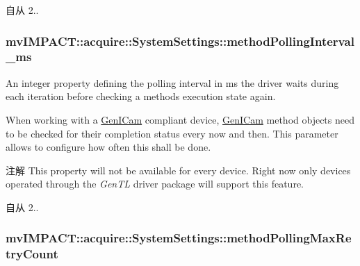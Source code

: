 \begin{DoxySince}{自从}
2.. 
\end{DoxySince}
\hypertarget{classmv_i_m_p_a_c_t_1_1acquire_1_1_system_settings_ac2f583cba036d74278d8093d4f529c4a}{
\subsubsection[{method\+Polling\+Interval\+\_\+ms}]{ mv\+I\+M\+P\+A\+C\+T\+::acquire\+::\+System\+Settings\+::method\+Polling\+Interval\+\_\+ms}}\label{classmv_i_m_p_a_c_t_1_1acquire_1_1_system_settings_ac2f583cba036d74278d8093d4f529c4a}


An integer property defining the polling interval in ms the driver waits during each iteration before checking a methods execution state again. 

When working with a \hyperlink{namespacemv_i_m_p_a_c_t_1_1acquire_1_1_gen_i_cam}{Gen\+I\+Cam} compliant device, \hyperlink{namespacemv_i_m_p_a_c_t_1_1acquire_1_1_gen_i_cam}{Gen\+I\+Cam} method objects need to be checked for their completion status every now and then. This parameter allows to configure how often this shall be done.

\begin{DoxyNote}{注解}
This property will not be available for every device. Right now only devices operated through the {\itshape Gen\+T\+L} driver package will support this feature.
\end{DoxyNote}
\begin{DoxySince}{自从}
2.. 
\end{DoxySince}
\hypertarget{classmv_i_m_p_a_c_t_1_1acquire_1_1_system_settings_a130e46bcd1eaf610f17c9049534b04e0}{
\subsubsection[{method\+Polling\+Max\+Retry\+Count}]{ mv\+I\+M\+P\+A\+C\+T\+::acquire\+::\+System\+Settings\+::method\+Polling\+Max\+Retry\+Count}}\label{classmv_i_m_p_a_c_t_1_1acquire_1_1_system_settings_a130e46bcd1eaf610f17c9049534b04e0}


